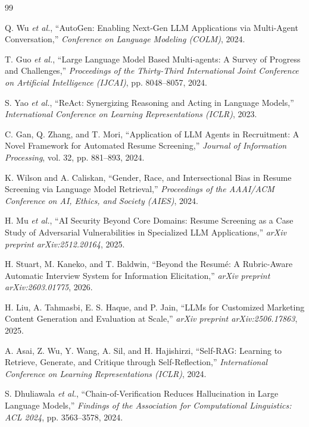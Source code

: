 \begin{thebibliography}{99}
\setlength{\itemsep}{0pt}\raggedright{}

 Q. Wu \textit{et al.}, ``AutoGen: Enabling Next-Gen LLM Applications via Multi-Agent Conversation,'' \textit{Conference on Language Modeling (COLM)}, 2024.

 T. Guo \textit{et al.}, ``Large Language Model Based Multi-agents: A Survey of Progress and Challenges,'' \textit{Proceedings of the Thirty-Third International Joint Conference on Artificial Intelligence (IJCAI)}, pp. 8048--8057, 2024.

 S. Yao \textit{et al.}, ``ReAct: Synergizing Reasoning and Acting in Language Models,'' \textit{International Conference on Learning Representations (ICLR)}, 2023.

 C. Gan, Q. Zhang, and T. Mori, ``Application of LLM Agents in Recruitment: A Novel Framework for Automated Resume Screening,'' \textit{Journal of Information Processing}, vol. 32, pp. 881--893, 2024.

 K. Wilson and A. Caliskan, ``Gender, Race, and Intersectional Bias in Resume Screening via Language Model Retrieval,'' \textit{Proceedings of the AAAI/ACM Conference on AI, Ethics, and Society (AIES)}, 2024.

 H. Mu \textit{et al.}, ``AI Security Beyond Core Domains: Resume Screening as a Case Study of Adversarial Vulnerabilities in Specialized LLM Applications,'' \textit{arXiv preprint arXiv:2512.20164}, 2025.

 H. Stuart, M. Kaneko, and T. Baldwin, ``Beyond the Resum\'e: A Rubric-Aware Automatic Interview System for Information Elicitation,'' \textit{arXiv preprint arXiv:2603.01775}, 2026.

 H. Liu, A. Tahmasbi, E. S. Haque, and P. Jain, ``LLMs for Customized Marketing Content Generation and Evaluation at Scale,'' \textit{arXiv preprint arXiv:2506.17863}, 2025.

 A. Asai, Z. Wu, Y. Wang, A. Sil, and H. Hajishirzi, ``Self-RAG: Learning to Retrieve, Generate, and Critique through Self-Reflection,'' \textit{International Conference on Learning Representations (ICLR)}, 2024.

 S. Dhuliawala \textit{et al.}, ``Chain-of-Verification Reduces Hallucination in Large Language Models,'' \textit{Findings of the Association for Computational Linguistics: ACL 2024}, pp. 3563--3578, 2024.


\end{thebibliography}
